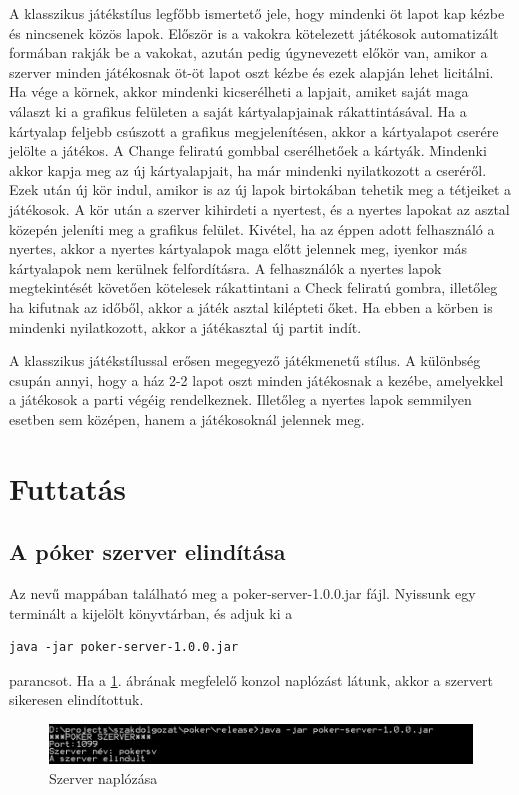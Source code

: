 A klasszikus játékstílus legfőbb ismertető jele, hogy mindenki öt lapot kap kézbe és nincsenek közös lapok. Először is a vakokra kötelezett játékosok automatizált formában rakják be a vakokat, azután pedig úgynevezett előkör van, amikor a szerver minden játékosnak öt-öt lapot oszt kézbe és ezek alapján lehet licitálni. Ha vége a körnek, akkor mindenki kicserélheti a lapjait, amiket saját maga választ ki a grafikus felületen a saját kártyalapjainak rákattintásával. Ha a kártyalap feljebb csúszott a grafikus megjelenítésen, akkor a kártyalapot cserére jelölte a játékos. A Change feliratú gombbal cserélhetőek a kártyák. Mindenki akkor kapja meg az új kártyalapjait, ha már mindenki nyilatkozott a cseréről. Ezek után új kör indul, amikor is az új lapok birtokában tehetik meg a tétjeiket a játékosok. A kör után a szerver kihirdeti a nyertest, és a nyertes lapokat az asztal közepén jeleníti meg a grafikus felület. Kivétel, ha az éppen adott felhasználó a nyertes, akkor a nyertes kártyalapok maga előtt jelennek meg, iyenkor más kártyalapok nem kerülnek felfordításra. A felhasználók a nyertes lapok megtekintését követően kötelesek rákattintani a Check feliratú gombra, illetőleg ha kifutnak az időből, akkor a játék asztal kilépteti őket. Ha ebben a körben is mindenki nyilatkozott, akkor a játékasztal új partit indít.

A klasszikus játékstílussal erősen megegyező játékmenetű stílus. A különbség csupán annyi, hogy a ház 2-2 lapot oszt minden játékosnak a kezébe, amelyekkel a játékosok a parti végéig rendelkeznek. Illetőleg a nyertes lapok semmilyen esetben sem középen, hanem a játékosoknál jelennek meg.

\section{Futtatás}

\subsection{A póker szerver elindítása}
Az  nevű mappában található meg  a poker-server-1.0.0.jar fájl. Nyissunk egy terminált a kijelölt könyvtárban, és adjuk ki a
 \begin{verbatim}
java -jar poker-server-1.0.0.jar
\end{verbatim}
parancsot. Ha a \ref{fig:server_started}. ábrának megfelelő konzol naplózást látunk, akkor a szervert sikeresen elindítottuk.
\begin{figure}[h!]
  \caption{Szerver naplózása}
  \label{fig:server_started}
  \centering
    \includegraphics[width=\linewidth]{user-documentation/images/server_started.jpg}
\end{figure}

